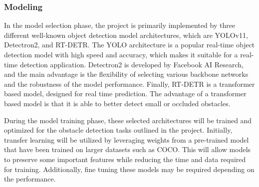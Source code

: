 \documentclass[stu,12pt,floatsintext]{apa7}
\begin{document}

\subsubsection{Modeling}

In the model selection phase, the project is primarily implemented by three different well-known object detection model architectures, which are YOLOv11, Detectron2, and RT-DETR. The YOLO architecture is a popular real-time object detection model with high speed and accuracy, which makes it suitable for a real-time detection application. Detectron2 is developed by Facebook AI Research, and the main advantage is the flexibility of selecting various backbone networks and the robustness of the model performance. Finally, RT-DETR is a transformer based model, designed for real time prediction. The advantage of a transformer based model is that it is able to better detect small or occluded obstacles.

During the model training phase, these selected architectures will be trained and optimized for the obstacle detection tasks outlined in the project. Initially, transfer learning will be utilized by leveraging weights from a pre-trained model that have been trained on larger datasets such as COCO. This will allow models to preserve some important features while reducing the time and data required for training. Additionally, fine tuning these models may be required depending on the performance.
\end{document}
